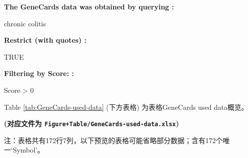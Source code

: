 \documentclass[
]{article}
\begin{document}
\begin{center}\begin{tcolorbox}[colback=gray!10, colframe=gray!50, width=0.9\linewidth, arc=1mm, boxrule=0.5pt]
\textbf{
The GeneCards data was obtained by querying
:}

\vspace{0.5em}

    chronic colitis

\vspace{2em}


\textbf{
Restrict (with quotes)
:}

\vspace{0.5em}

    TRUE

\vspace{2em}


\textbf{
Filtering by Score:
:}

\vspace{0.5em}

    Score > 0

\vspace{2em}
\end{tcolorbox}
\end{center}

Table \ref{tab:GeneCards-used-data} (下方表格) 为表格GeneCards used data概览。

\textbf{(对应文件为 \texttt{Figure+Table/GeneCards-used-data.xlsx})}

\begin{center}\begin{tcolorbox}[colback=gray!10, colframe=gray!50, width=0.9\linewidth, arc=1mm, boxrule=0.5pt]注：表格共有172行7列，以下预览的表格可能省略部分数据；含有172个唯一`Symbol'。
\end{tcolorbox}
\end{center}
\end{document}
